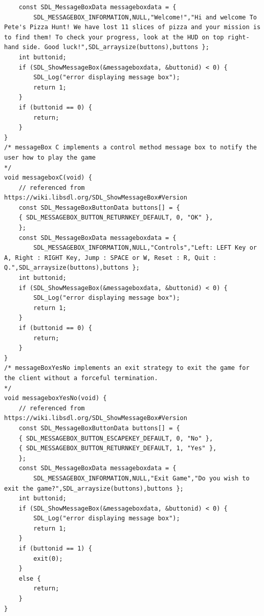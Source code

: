 \documentclass{article}
\begin{document}
\begin{lstlisting}
	const SDL_MessageBoxData messageboxdata = {
		SDL_MESSAGEBOX_INFORMATION,NULL,"Welcome!","Hi and welcome To Pete's Pizza Hunt! We have lost 11 slices of pizza and your mission is to find them! To check your progress, look at the HUD on top right-hand side. Good luck!",SDL_arraysize(buttons),buttons };
	int buttonid;
	if (SDL_ShowMessageBox(&messageboxdata, &buttonid) < 0) {
		SDL_Log("error displaying message box");
		return 1;
	}
	if (buttonid == 0) {
		return;
	}
}
/* messageBox C implements a control method message box to notify the user how to play the game
*/
void messageboxC(void) {
	// referenced from https://wiki.libsdl.org/SDL_ShowMessageBox#Version
	const SDL_MessageBoxButtonData buttons[] = {
	{ SDL_MESSAGEBOX_BUTTON_RETURNKEY_DEFAULT, 0, "OK" },
	};
	const SDL_MessageBoxData messageboxdata = {
		SDL_MESSAGEBOX_INFORMATION,NULL,"Controls","Left: LEFT Key or A, Right : RIGHT Key, Jump : SPACE or W, Reset : R, Quit : Q.",SDL_arraysize(buttons),buttons };
	int buttonid;
	if (SDL_ShowMessageBox(&messageboxdata, &buttonid) < 0) {
		SDL_Log("error displaying message box");
		return 1;
	}
	if (buttonid == 0) {
		return;
	}
}
/* messageBoxYesNo implements an exit strategy to exit the game for the client without a forceful termination.
*/
void messageboxYesNo(void) {
	// referenced from https://wiki.libsdl.org/SDL_ShowMessageBox#Version
	const SDL_MessageBoxButtonData buttons[] = {
	{ SDL_MESSAGEBOX_BUTTON_ESCAPEKEY_DEFAULT, 0, "No" },
	{ SDL_MESSAGEBOX_BUTTON_RETURNKEY_DEFAULT, 1, "Yes" },
	};
	const SDL_MessageBoxData messageboxdata = {
		SDL_MESSAGEBOX_INFORMATION,NULL,"Exit Game","Do you wish to exit the game?",SDL_arraysize(buttons),buttons };
	int buttonid;
	if (SDL_ShowMessageBox(&messageboxdata, &buttonid) < 0) {
		SDL_Log("error displaying message box");
		return 1;
	}
	if (buttonid == 1) {
		exit(0);
	}
	else {
		return;
	}
}

\end{lstlisting}
\end{document}
